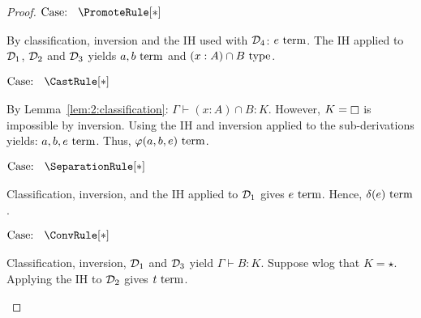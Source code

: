 \begin{proof}
    $\text{Case: }\begin{array}{c} \PromoteRule[*] \end{array}$
    \begin{proofcase}
        By classification, inversion and the IH used with $\mathcal{D}_{4}$: $e~\textnormal{term}$.
        The IH applied to $\mathcal{D}_{1}$, $\mathcal{D}_{2}$ and $\mathcal{D}_{3}$ yields $a, b~\textnormal{term}$ and $(x : A) \cap B~\textnormal{type}$.
    \end{proofcase}

    $\text{Case: }\begin{array}{c} \CastRule[*] \end{array}$
    \begin{proofcase}
        By Lemma~\ref{lem:2:classification}: $\Gamma \vdash (x : A) \cap B : K$.
        However, $K = \kind$ is impossible by inversion.
        Using the IH and inversion applied to the sub-derivations yields: $a, b, e~\textnormal{term}$.
        Thus, $\varphi(a, b, e)~\textnormal{term}$.
    \end{proofcase}

    $\text{Case: }\begin{array}{c} \SeparationRule[*] \end{array}$
    \begin{proofcase}
        Classification, inversion, and the IH applied to $\mathcal{D}_{1}$ gives $e~\textnormal{term}$.
        Hence, $\delta(e)~\textnormal{term}$.
    \end{proofcase}

    $\text{Case: }\begin{array}{c} \ConvRule[*] \end{array}$
    \begin{proofcase}
        Classification, inversion, $\mathcal{D}_{1}$ and $\mathcal{D}_{3}$ yield $\Gamma \vdash B : K$.
        Suppose wlog that $K = \star$.
        Applying the IH to $\mathcal{D}_{2}$ gives $t~\textnormal{term}$.
    \end{proofcase}
\end{proof}
